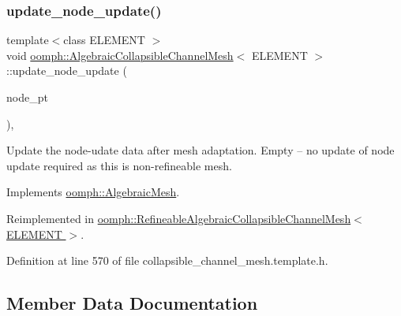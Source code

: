 \mbox{\label{classoomph_1_1AlgebraicCollapsibleChannelMesh_abad38fb50d067a126af1161a3a603972}} 
\subsubsection{\texorpdfstring{update\+\_\+node\+\_\+update()}{update\_node\_update()}}
{\footnotesize\ttfamily template$<$class E\+L\+E\+M\+E\+NT $>$ \\
void \hyperlink{classoomph_1_1AlgebraicCollapsibleChannelMesh}{oomph\+::\+Algebraic\+Collapsible\+Channel\+Mesh}$<$ E\+L\+E\+M\+E\+NT $>$\+::update\+\_\+node\+\_\+update (\begin{DoxyParamCaption}\item[{\hyperlink{classoomph_1_1AlgebraicNode}{Algebraic\+Node} $\ast$\&}]{node\+\_\+pt }\end{DoxyParamCaption})\hspace{0.3cm}{\ttfamily [inline]}, {\ttfamily [virtual]}}



Update the node-\/udate data after mesh adaptation. Empty -- no update of node update required as this is non-\/refineable mesh. 



Implements \hyperlink{classoomph_1_1AlgebraicMesh_a6c6a35ae2be6e2766f5b80d85693c1ce}{oomph\+::\+Algebraic\+Mesh}.



Reimplemented in \hyperlink{classoomph_1_1RefineableAlgebraicCollapsibleChannelMesh_a4bc2b99f24e5e5dc534fe5906d4f4e6e}{oomph\+::\+Refineable\+Algebraic\+Collapsible\+Channel\+Mesh$<$ E\+L\+E\+M\+E\+N\+T $>$}.



Definition at line 570 of file collapsible\+\_\+channel\+\_\+mesh.\+template.\+h.



\subsection{Member Data Documentation}
\mbox{\label{classoomph_1_1AlgebraicCollapsibleChannelMesh_ab3848ae5c357f45addf4bcfeca1a9d18}} 
